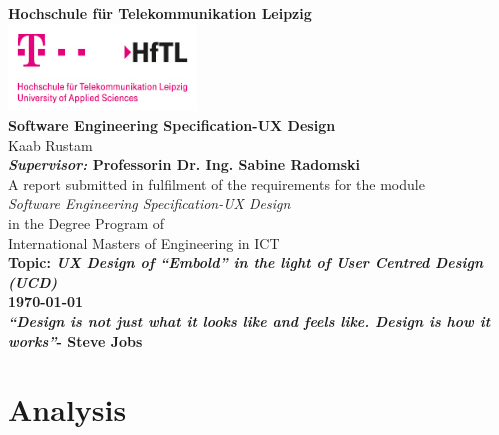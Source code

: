 \documentclass[11pt,oneside]{book}
\begin{document}

\begin{titlepage}

\begin{center}

{\LARGE \bfseries Hochschule für Telekommunikation Leipzig}\\[1.5cm]
\linespread{1}
\includegraphics[width=5cm]{HFTL.jpg}\\[1cm]

\linespread{1}\LARGE {\bfseries Software Engineering Specification-UX Design}\\[1.5cm]
{\Large Kaab Rustam}\\[1cm]
{\large \bfseries \emph{Supervisor:} Professorin Dr. Ing. Sabine Radomski}\\[1cm]
\large A report submitted in fulfilment of the requirements for the module\\
 \emph {Software Engineering Specification-UX Design} \\[0.3cm] 
{\scriptsize in the Degree Program of}
\\[0.3cm]
 International Masters of Engineering in ICT \\[1cm]

\Large \bfseries {Topic: \emph {UX Design of ``Embold'' in the light of  User Centred Design (UCD) }}\\[0.5 cm]
\today \\[2 cm]

\small \emph {``Design is not just what it looks like and feels like. Design is how it works''}-{ \bfseries Steve Jobs}

\end{center}

\end{titlepage}


\tableofcontents
\listoffigures


\chapter{Analysis}

\end{document}
